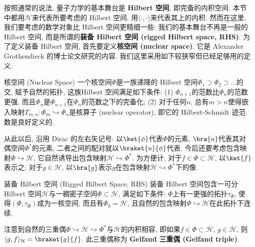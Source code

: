 
     按照通常的说法, 量子力学的基本舞台是 \textbf{Hilbert 空间}, 即完备的内积空间. 本节中都用$\mathcal{H}$来代表所要考虑的 Hilbert 空间, 用$\langle\cdot,\cdot\rangle$来代表其上的内积. 然而在这里, 我们要考虑的数学对象比 Hilbert 空间更精细一些: 我们的基本舞台不再是一般的 Hilbert 空间, 而是所谓的\textbf{装备 Hilbert 空间 (rigged Hilbert space, RHS)}. 为了定义装备 Hilbert 空间, 首先要定义\textbf{核空间 (nuclear space)}. 它是 Alexander Grothendieck 的博士论文研究的内容. 我们这里采用如下较狭窄但已经足够用的定义:

\begin{definition}{核空间 (Nuclear Space)}
一个核空间$\Phi$是一族递降的 Hilbert 空间$\Phi_1\supset\Phi_2\supset...$的交, 赋予自然的拓扑, 这族Hilbert 空间满足如下条件: (1) $\Phi_{n+1}$的范数比$\Phi_n$的范数更强, 而且$\Phi_n$是$\Phi_{n+1}$在$\Phi_n$的范数之下的完备化; (2) 对于任何$n$, 总有$m>n$使得嵌入映射$T_{m,n}:\Phi_{m}\hookrightarrow\Phi_n$是核算子 (nuclear operator), 即它的 Hilbert-Schmidt 迹范数是良好定义的.
\end{definition}

    从此以后, 沿用 Dirac 的左右矢记号: 以$\ket{\phi}$代表$\Phi$的元素, $\bra{u}$代表其对偶空间$\Phi^*$的元素, 二者之间的配对就以$\braket{u}{\phi}$代表. 今后还要考虑包含映射$\Phi\hookrightarrow\mathcal{H}$, 它自然诱导出包含映射$\mathcal{H}\hookrightarrow\Phi^*$. 为方便计, 对于$f\in\Phi\subset\mathcal{H}$, 以$\ket{f}$表示之; 对于$g\in\mathcal{H}$, 以$\bra{g}$表示$g$在包含映射$\mathcal{H}\hookrightarrow\Phi^*$下的像.

\begin{definition}{装备 Hilbert 空间 (Rigged Hilbert Space, RHS)}
装备 Hilbert 空间包含一可分 Hilbert 空间$\mathcal{H}$与一稠密子空间$\Phi\subset\mathcal{H}$, 满足如下条件: $\Phi$上有一更强的拓扑$\tau_\Phi$, 使得$(\Phi,\tau_\Phi)$成为一核空间, 而且有$\Phi_0=\mathcal{H}$, 且自然的包含映射$\Phi\hookrightarrow\mathcal{H}$在此拓扑下连续.
\end{definition}

    注意到自然的三重偶$\Phi\hookrightarrow\mathcal{H}\hookrightarrow\Phi^*$与$\mathcal{H}$的内积相容, 即如果$f\in\Phi\subset\mathcal{H}$, $g\in\mathcal{H}$, 则$\langle g,f\rangle_{\mathcal{H}}=\braket{g}{f}$. 此三重偶称为 \textbf{Gelfand 三重偶 (Gelfand triple)}.

